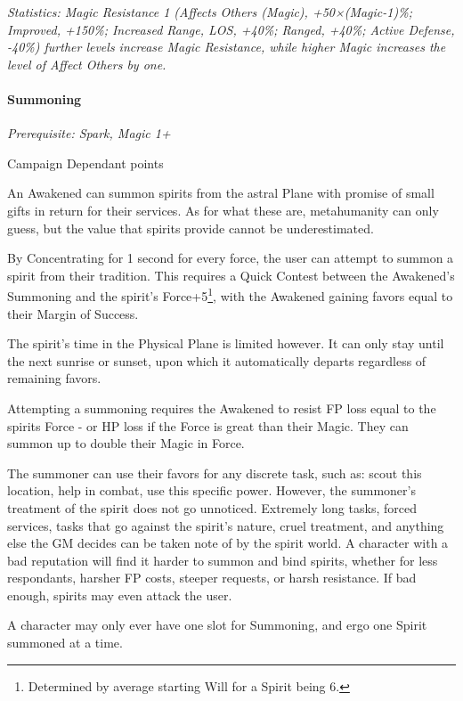 \begin{multicols*}{3}
	\textit{\textcolor{OliveGreen}{Statistics: Magic Resistance 1 (Affects Others (Magic), +50×(Magic-1)\%; Improved, +150\%; Increased Range, LOS, +40\%; Ranged, +40\%; Active Defense, -40\%) further levels increase Magic Resistance, while higher Magic increases the level of Affect Others by one.}}
	
	\paragraph{Summoning}\label{summoning}
	\textit{Prerequisite: Spark, Magic 1+}
	\begin{flushright}
		Campaign Dependant points
	\end{flushright}
	
	An Awakened can summon spirits from the astral Plane with promise of small gifts in return for their services. As for what these are, metahumanity can only guess, but the value that spirits provide cannot be underestimated.
	
	By Concentrating for 1 second for every force, the user can attempt to summon a spirit from their tradition. This requires a Quick Contest between the Awakened's Summoning and the spirit's Force+5\footnote{Determined by average starting Will for a Spirit being 6.}, with the Awakened gaining favors equal to their Margin of Success. 
	
	The spirit's time in the Physical Plane is limited however. It can only stay until the next sunrise or sunset, upon which it automatically departs regardless of remaining favors.
	
	Attempting a summoning requires the Awakened to resist FP loss equal to the spirits Force - or HP loss if the Force is great than their Magic. They can summon up to double their Magic in Force.
	
	The summoner can use their favors for any discrete task, such as: scout this location, help in combat, use this specific power. However, the summoner's treatment of the spirit does not go unnoticed. Extremely long tasks, forced services, tasks that go against the spirit's nature, cruel treatment, and anything else the GM decides can be taken note of by the spirit world. A character with a bad reputation will find it harder to summon and bind spirits, whether for less respondants, harsher FP costs, steeper requests, or harsh resistance. If bad enough, spirits may even attack the user.
	
	A character may only ever have one slot for Summoning, and ergo one Spirit summoned at a time.
	

\end{multicols*}

